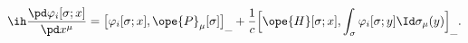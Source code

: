 \begin{equation}	\label{12.80new6}
\ih\frac{\pd \varphi_i[\sigma;x] }{\pd x^\mu}
=
\bigl[ \varphi_i[\sigma;x] , \ope{P}_\mu[\sigma]
\bigr]_{\_}
+
\frac{1}{c} \Bigl[\ope{H}[\sigma;x] ,
	\int_\sigma \varphi_i[\sigma;y] \Id\sigma_\mu(y) \Bigr]_{\_} .
	\end{equation}

